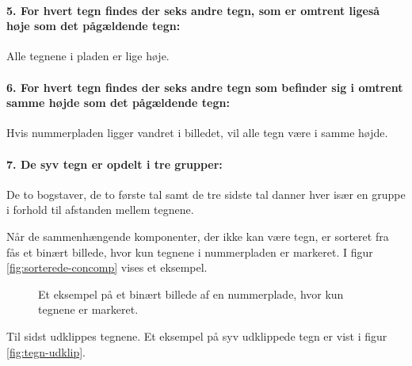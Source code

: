 \paragraph{5. For hvert tegn findes der seks andre tegn, som er omtrent ligeså høje som det pågældende tegn:} Alle tegnene i pladen er lige høje.
\paragraph{6. For hvert tegn findes der seks andre tegn som befinder sig i omtrent samme højde som det pågældende tegn:} Hvis nummerpladen ligger vandret i billedet, vil alle tegn være i samme højde.
\paragraph{7. De syv tegn er opdelt i tre grupper:} De to bogstaver, de to første tal samt de tre sidste tal danner hver især en gruppe i forhold til afstanden mellem tegnene.



Når de sammenhængende komponenter, der ikke kan være tegn, er sorteret fra fås et binært billede, hvor kun tegnene i nummerpladen er markeret. I figur \vref{fig:sorterede-concomp} vises et eksempel.

\begin{figure}[htp]
  \centering
  \caption{Et eksempel på et binært billede af en nummerplade, hvor kun tegnene er markeret.}
  \label{fig:sorterede-concomp}
\end{figure}

Til sidst udklippes tegnene. Et eksempel på syv udklippede tegn er vist i figur \vref{fig:tegn-udklip}.

